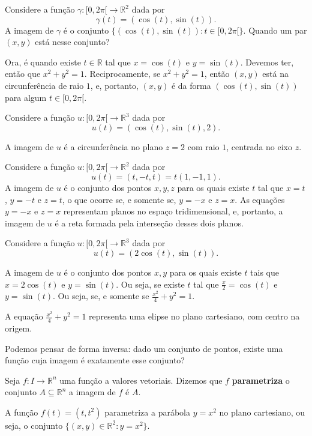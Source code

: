 \begin{example}
    Considere a função $\gamma:[0, 2\pi[\rightarrow \mathbb R^2$ dada por
    \[
        \gamma(t) = (\cos (t), \sin(t)).
    \]
    A imagem de $\gamma$ é o conjunto $\{(\cos (t), \sin(t)):t\in [0, 2\pi[\}$. Quando um par $(x, y)$ está nesse conjunto?

    Ora, é quando existe $t \in \mathbb R$ tal que $x=\cos(t)$ e $y=\sin(t)$.
    Devemos ter, então que $x^2+y^2=1$.
    Reciprocamente, se $x^2+y^2=1$, então $(x, y)$ está na circunferência de raio $1$, e, portanto, $(x, y)$ é da forma $(\cos(t), \sin(t))$ para algum $t\in [0, 2\pi[$.
\end{example}
\begin{example}
    Considere a função $u:[0, 2\pi[\rightarrow \mathbb R^3$ dada por
    \[
        u(t) = (\cos(t), \sin(t), 2).
    \]

    A imagem de $u$ é a circunferência no plano $z=2$ com raio $1$, centrada no eixo $z$.
\end{example}

\begin{example}
    Considere a função $u:[0, 2\pi[\rightarrow \mathbb R^2$ dada por
    \[
        u(t) = (t, -t, t)=t(1, -1, 1).
    \]
    A imagem de $u$ é o conjunto dos pontos $x, y, z$ para os quais existe $t$ tal que $x=t$, $y=-t$ e $z=t$, o que ocorre se, e somente se, $y=-x$ e $z=x$.
    As equações $y=-x$ e $z=x$ representam planos no espaço tridimensional, e, portanto, a imagem de $u$ é a reta formada pela interseção desses dois planos.
\end{example}


\begin{example}
    Considere a função $u:[0, 2\pi[\rightarrow \mathbb R^3$ dada por
    \[
        u(t) = (2\cos(t), \sin(t)).
    \]

    A imagem de $u$ é o conjunto dos pontos $x, y$ para os quais existe $t$ tais que $x=2\cos(t)$ e $y=\sin(t)$.
    Ou seja, se existe $t$ tal que $\frac{x}{2}=\cos(t)$ e $y=\sin(t)$.
    Ou seja, se, e somente se $\frac{x^2}{4}+y^2=1$.

    A equação $\frac{x^2}{4}+y^2=1$ representa uma elipse no plano cartesiano, com centro na origem.
\end{example}

Podemos pensar de forma inversa: dado um conjunto de pontos, existe uma função cuja imagem é exatamente esse conjunto?
\begin{definition}
    Seja $f:I\rightarrow \mathbb R^n$ uma função a valores vetoriais.
    Dizemos que $f$ \textbf{parametriza} o conjunto $A\subseteq \mathbb R^n$ a imagem de $f$ é $A$.
\end{definition}
\begin{example}
    A função $f(t)=(t, t^2)$ parametriza a parábola $y=x^2$ no plano cartesiano, ou seja, o conjunto $\{(x, y) \in \mathbb R^2: y=x^2\}$.
\end{example}

